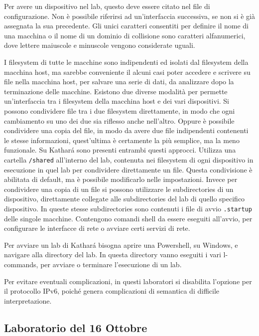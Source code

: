 \documentclass{article}
\numberwithin{equation}{subsection}
\begin{document}
Per avere un dispositivo nel lab, questo deve essere citato nel file di configurazione. Non è possibile riferirsi ad un'interfaccia successiva, se non si è già assegnata la sua precedente. Gli unici caratteri 
consentiti per definire il nome di una macchina o il nome di un dominio di collisione sono caratteri alfanumerici, dove lettere maiuscole e minuscole vengono considerate uguali. 

I filesystem di tutte le macchine sono indipendenti ed isolati dal filesystem della macchina host, ma sarebbe conveniente il alcuni casi poter accedere e scrivere su file nella macchina host, per salvare una 
serie di dati, da analizzare dopo la terminazione delle macchine. 
Esistono due diverse modalità per permette un'interfaccia tra i filesystem della macchina host e dei vari dispositivi. Si possono condividere file tra i due filesystem direttamente, in modo che ogni cambiamento 
su uno dei due sia riflesso anche nell'altro. Oppure è possibile condividere una copia del file, in modo da avere due file indipendenti contenenti le stesse informazioni, quest'ultima è certamente la più 
semplice, ma la meno funzionale. 
Su Kathar\'{a} sono presenti entrambi questi approcci. Utilizza una cartella \verb|/shared| all'interno del lab, contenuta nei filesystem di ogni dispositivo in esecuzione in quel lab per condividere direttamente 
un file. Questa condivisione è abilitata di default, ma è possibile modificarlo nelle impostazioni. Invece per condividere una copia di un file si possono utilizzare le subdirectories di un dispositivo, direttamente 
collegate alle subdirectories del lab di quello specifico dispositivo. 
In queste stesse subdirectories sono contenuti i file di avvio \verb|.startup| delle singole macchine. Contengono comandi shell da essere eseguiti all'avvio, per configurare le interfacce di rete o avviare 
certi servizi di rete. 

Per avviare un lab di Kathar\'{a} bisogna aprire una Powershell, su Windows, e navigare alla directory del lab. In questa directory vanno eseguiti i vari l-commands, per avviare o terminare l'esecuzione di un lab. 

Per evitare eventuali complicazioni, in questi laboratori si disabilita l'opzione per il protocollo IPv6, poiché genera complicazioni di semantica di difficile interpretazione. 

\subsection{Laboratorio del 16 Ottobre}
\end{document}
